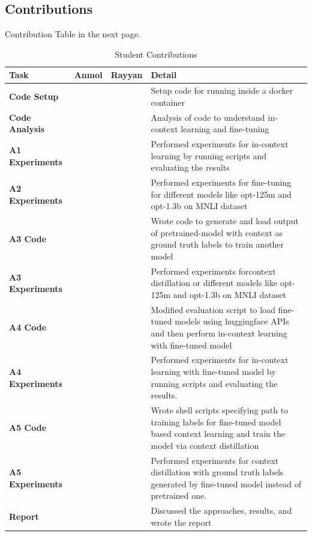 \documentclass[10pt,twocolumn,letterpaper]{article}
\begin{document}
\subsection{Contributions}
Contribution Table in the next page.
\begin{table}[!h]
	\begin{center}
	\begin{tabular}{|p{3cm}|p{2cm}|p{2cm}|p{4cm}|}
	\hline
	\textbf{Task} & \textbf{Anmol} & \textbf{Rayyan} & \textbf{Detail} \\
	\hline
	\hline
	\textbf{Code Setup} & \checkmark & \checkmark & Setup code for running inside a docker container \\
	\hline
	\textbf{Code Analysis} & \checkmark & \checkmark & Analysis of code to understand in-context learning and fine-tuning \\
	\hline
	\textbf{A1 Experiments} & \checkmark & & Performed experiments for in-context learning by running scripts and evaluating the results \\
	\hline
	\textbf{A2 Experiments} & \checkmark & & Performed experiments for fine-tuning for different models like opt-125m and opt-1.3b on MNLI dataset \\
	\hline
	\textbf{A3 Code} & & \checkmark & Wrote code to generate and load output of pretrained-model with context as ground truth labels to train another model \\
	\hline
	\textbf{A3 Experiments} & & \checkmark & Performed experiments forcontext distillation or different models like opt-125m and opt-1.3b on MNLI dataset \\
	\hline
	\textbf{A4 Code} & \checkmark & & Modified evaluation script to load fine-tuned models using huggingface APIs and then perform in-context learning with fine-tuned model \\
	\hline
	\textbf{A4 Experiments} & \checkmark & & Performed experiments for in-context learning  with fine-tuned model by running scripts and evaluating the results.	 \\
	\hline
	\textbf{A5 Code} & & \checkmark & Wrote shell scripts specifying path to training labels for fine-tuned model based context learning and train the model via context distillation \\
	\hline
	\textbf{A5 Experiments} & & \checkmark & Performed experiments for context distillation with ground truth labels generated by fine-tuned model instead of pretrained one. \\
	\hline
	\textbf{Report} & \checkmark & \checkmark & Discussed the approaches, results, and wrote the report \\
	\hline
	\end{tabular}
	\end{center}
	\caption{Student Contributions}
	\end{table}
\end{document}
